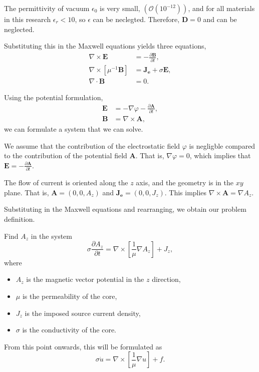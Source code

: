 \begin{assumption}
    The permittivity of vacuum $\epsilon_0$ is very small, $(\mathcal{O}(10^{-12}))$, and for all materials in this research $\epsilon_r < 10$, so $\epsilon$ can be neclegted. Therefore, $\mathbf{D} = 0$ and can be neglected.
\end{assumption}

Substituting this in the Maxwell equations yields three equations,
\begin{align*}
    \nabla \times \mathbf{E} &= -\frac{\partial \mathbf{B}}{\partial t}, \\
    \nabla \times \left[\mu^{-1}\mathbf{B}\right] &=  \mathbf{J_e} + \sigma \mathbf{E}, \\
    \nabla \cdot \mathbf{B} &= 0.
\end{align*}

Using the potential formulation,
\begin{align*}
    \mathbf{E} &= -\nabla \varphi -\frac{\partial \mathbf{A}}{\partial t}, \\
    \mathbf{B} &= \nabla \times \mathbf A,
\end{align*}
we can formulate a system that we can solve.

\begin{assumption}
    We assume that the contribution of the electrostatic field $\varphi$ is negligble compared to the contribution of the potential field $\mathbf A$. That is, $\nabla \varphi = 0$, which implies that $\mathbf{E} = -\frac{\partial \mathbf{A}}{\partial t}$.
\end{assumption}

\begin{assumption}
    The flow of current is oriented along the $z$ axis, and the geometry is in the $xy$ plane. That is, $\mathbf{A} = (0, 0, A_z)$ and $\mathbf{J_e} = (0, 0, J_z)$. This implies $\nabla \times \mathbf A = \nabla A_z$.
\end{assumption}

Substituting in the Maxwell equations and rearranging, we obtain our problem definition.

\begin{problem}
    Find $A_z$ in the system
    \begin{equation}
        \sigma\frac{\partial A_z}{\partial t} = \nabla \times \left[\frac{1}{\mu}\nabla A_z\right] + J_z,
    \end{equation}
    where
    \begin{itemize}
        \item $A_z$ is the magnetic vector potential in the $z$ direction,
        \item $\mu$ is the permeability of the core,
        \item $J_z$ is the imposed source current density,
        \item $\sigma$ is the conductivity of the core.
    \end{itemize}
    From this point onwards, this will be formulated as
    \begin{equation}
        \sigma\dot u = \nabla \times \left[\frac{1}{\mu}\nabla u\right] + f.
    \end{equation}
\end{problem}

